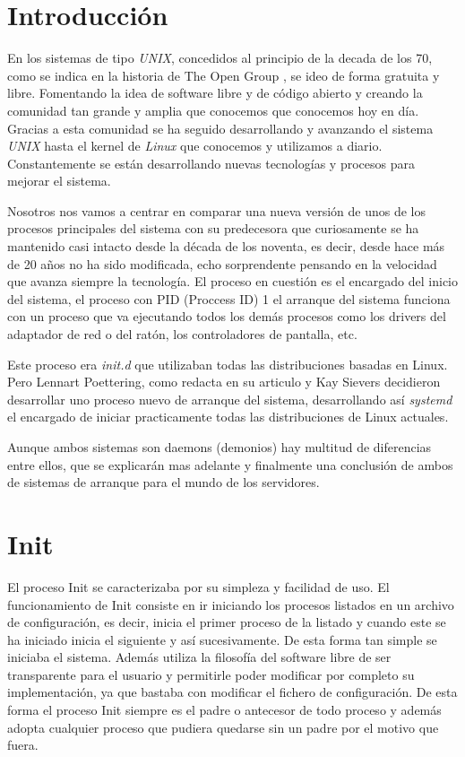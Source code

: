 \section{Introducción} %
En los sistemas de tipo \textit{UNIX}, concedidos al principio de la decada
de los 70, como se indica en la historia de The Open Group \cite{unix}, 
se ideo de forma gratuita y libre. Fomentando la idea de software libre
y de código abierto y creando la comunidad tan grande y amplia que conocemos 
que conocemos hoy en día. Gracias a esta comunidad se ha seguido
desarrollando y avanzando el sistema \textit{UNIX} hasta el kernel de 
\textit{Linux} que conocemos y utilizamos a diario. Constantemente se están
desarrollando nuevas tecnologías y procesos para mejorar el sistema.

Nosotros nos vamos a centrar en comparar una nueva versión de unos de los
procesos principales del sistema con su predecesora que curiosamente se ha
mantenido casi intacto desde la década de los noventa, es decir, desde hace
más de 20 años no ha sido modificada, echo sorprendente pensando en la
velocidad que avanza siempre la tecnología. El proceso en cuestión es el
encargado del inicio del sistema, el proceso con PID (Proccess ID) 1 el
arranque del sistema funciona con un proceso que va ejecutando todos los demás procesos como los drivers del adaptador de red o del ratón, los
controladores de pantalla, etc. 

Este proceso era \textit{init.d} que utilizaban todas las distribuciones
basadas en Linux. Pero Lennart Poettering, como redacta en su articulo
\cite{Lennart} y Kay Sievers decidieron desarrollar uno proceso nuevo de
arranque del sistema, desarrollando así \textit{systemd} el encargado
de iniciar practicamente todas las distribuciones de Linux actuales.

Aunque ambos sistemas son daemons (demonios) hay multitud de diferencias
entre ellos, que se explicarán mas adelante y finalmente una conclusión
de ambos de sistemas de arranque para el mundo de los servidores.




\section{Init} %
El proceso Init se caracterizaba por su simpleza y facilidad de uso. El funcionamiento de Init consiste
en ir iniciando los procesos listados en un archivo de configuración, 
es decir, inicia el primer proceso de la listado y cuando este se ha iniciado
inicia el siguiente y así sucesivamente. De esta forma tan simple se
iniciaba el sistema. Además utiliza la filosofía del software libre de 
ser transparente para el usuario y permitirle poder modificar por completo
su implementación, ya que bastaba con modificar el fichero de configuración.
De esta forma el proceso Init siempre es el padre o antecesor de todo 
proceso y además adopta cualquier proceso que pudiera quedarse sin un
padre por el motivo que fuera.

